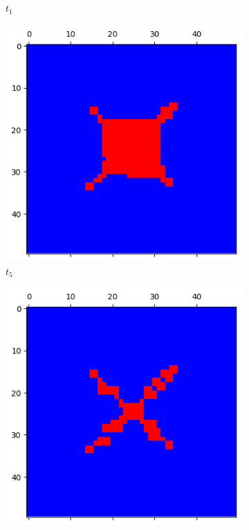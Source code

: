 \documentclass[letterpaper]{article}
\begin{document}
\begin{figure}[H]
\begin{subfigure}{.33\textwidth}
      \caption{$t_{1}$}
    \end{subfigure}
    \begin{subfigure}{.33\textwidth}
      \centering
      \includegraphics[width=1\linewidth]{images/assign2/part31-coop/t5}
      \caption{$t_{5}$}
    \end{subfigure}
    \begin{subfigure}{.33\textwidth}
      \centering
      \includegraphics[width=1\linewidth]{images/assign2/part31-coop/t10}

\end{subfigure}
\end{figure}
\end{document}
